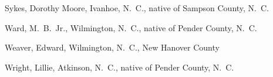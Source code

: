 \documentclass[11pt, a5paper, openright]{book}
\begin{document}
\begin{thebibliography}{99}
  Sykes, Dorothy Moore, Ivanhoe, N.~C., native of Sampson County, N.~C.

  Ward, M.~B.~Jr., Wilmington, N.~C., native of Pender County, N.~C.

  Weaver, Edward, Wilmington, N.~C., New Hanover County

  Wright, Lillie, Atkinson, N.~C., native of Pender County, N.~C.

\end{thebibliography}

\printindex{}
\end{document}
